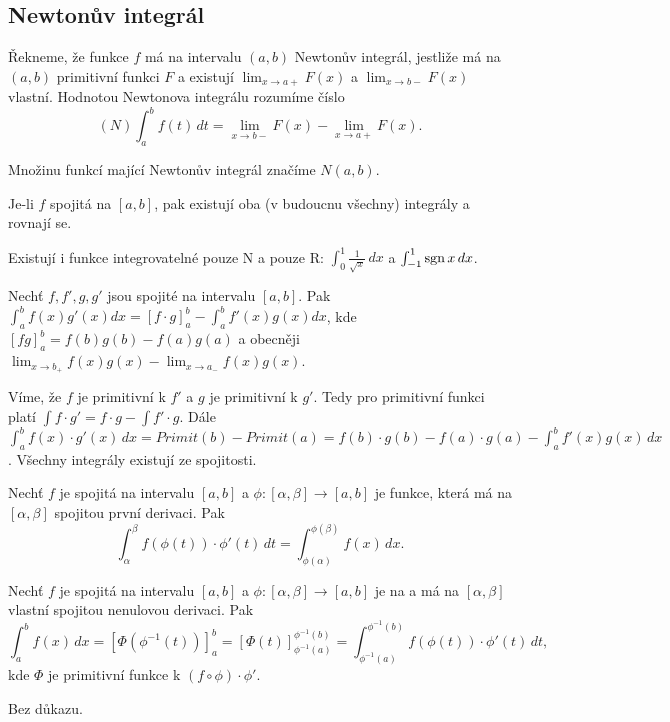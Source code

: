 \documentclass[12pt]{article}                   %
\begin{document}
    \subsection{Newtonův integrál}
        \begin{definice}
            Řekneme, že funkce $f$ má na intervalu $(a, b)$ Newtonův integrál, jestliže má na $(a, b)$ primitivní funkci $F$ a existují $\lim_{x \rightarrow a+} F(x)$ a $\lim_{x \rightarrow b-} F(x)$ vlastní. Hodnotou Newtonova integrálu rozumíme číslo
            $$ (N) \int_a^b f(t)\,dt = \lim_{x \rightarrow b-} F(x) - \lim_{x \rightarrow a+} F(x). $$ 

            Množinu funkcí mající Newtonův integrál značíme $N(a, b)$.
        \end{definice}

        \begin{dusledek}
            Je-li $f$ spojitá na $[a, b]$, pak existují oba (v budoucnu všechny) integrály a rovnají se.

            Existují i funkce integrovatelné pouze N a pouze R: $\int_0^1 \frac{1}{\sqrt{x}}\,dx$ a $\int_{-1}^1 \operatorname{sgn} x\,dx$.
        \end{dusledek}

        \begin{veta}
            Nechť $f, f', g, g'$ jsou spojité na intervalu $[a, b]$. Pak $\int_a^b f(x) g'(x)dx = [f·g]_a^b - \int_a^b f'(x) g(x)dx$, kde $[fg]_a^b = f(b)g(b) - f(a)g(a)$ a obecněji $\lim_{x \rightarrow b_+} f(x)g(x) - \lim_{x \rightarrow a_-} f(x)g(x)$.

            \begin{dukazin}
                Víme, že $f$ je primitivní k $f'$ a $g$ je primitivní k $g'$. Tedy pro primitivní funkci platí $\int f·g' = f·g - \int f'·g$. Dále $\int_a^b f(x)·g'(x)\,dx = Primit(b) - Primit(a) = f(b)·g(b) - f(a)·g(a) - \int_a^b f'(x)g(x)\,dx$. Všechny integrály existují ze spojitosti.
            \end{dukazin}
        \end{veta}

        \begin{veta}
            Nechť $f$ je spojitá na intervalu $[a, b]$ a $\phi:[\alpha, \beta] \rightarrow [a, b]$ je funkce, která má na $[\alpha, \beta]$ spojitou první derivaci. Pak
            $$ \int_\alpha^\beta f(\phi(t))·\phi'(t)\,dt = \int_{\phi(\alpha)}^{\phi(\beta)}f(x)\,dx. $$

            Nechť $f$ je spojitá na intervalu $[a, b]$ a $\phi: [\alpha, \beta] \rightarrow [a, b]$ je na a má na $[\alpha, \beta]$ vlastní spojitou nenulovou derivaci. Pak
            $$ \int_a^b f(x)\,dx = [\Phi(\phi^{-1}(t))]_a^b = [\Phi(t)]_{\phi^{-1}(a)}^{\phi^{-1}(b)} = \int_{\phi^{-1}(a)}^{\phi^{-1}(b)} f(\phi(t))·\phi'(t)\,dt, $$
            kde $\Phi$ je primitivní funkce k $(f \circ \phi)·\phi'$.
            \begin{dukazin}
                Bez důkazu.
            \end{dukazin}
        \end{veta}
\end{document}
